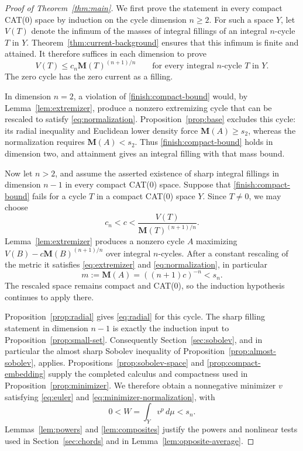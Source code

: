\documentclass[11pt]{article}
\numberwithin{equation}{section}
\theoremstyle{definition}
\theoremstyle{remark}
\begin{document}
\begin{proof}[Proof of Theorem~\ref{thm:main}]
We first prove the statement in every compact CAT(0) space by induction
on the cycle dimension \(n\ge2\). For such a space \(Y\), let
\(V(T)\) denote the infimum of the masses of integral fillings of an
integral \(n\)-cycle \(T\) in \(Y\). Theorem~\ref{thm:current-background}
ensures that this infimum is finite and attained. It therefore suffices
in each dimension to prove
\begin{equation}
 \label{finish:compact-bound}
 V(T)\le c_n\mathbf M(T)^{(n+1)/n}
 \qquad\text{for every integral }n\text{-cycle }T\text{ in }Y.
\end{equation}
The zero cycle has the zero current as a filling.

In dimension \(n=2\), a violation of
\eqref{finish:compact-bound} would, by Lemma~\ref{lem:extremizer},
produce a nonzero extremizing cycle that can be rescaled to satisfy
\eqref{eq:normalization}. Proposition~\ref{prop:base} excludes this
cycle: its radial inequality and Euclidean lower density force
\(\mathbf M(A)\ge s_2\), whereas the normalization requires
\(\mathbf M(A)<s_2\). Thus \eqref{finish:compact-bound} holds in
dimension two, and attainment gives an integral filling with that mass
bound.

Now let \(n>2\), and assume the asserted existence of sharp integral
fillings in dimension \(n-1\) in every compact CAT(0) space. Suppose
that \eqref{finish:compact-bound} fails for a cycle \(T\) in a compact
CAT(0) space \(Y\). Since \(T\ne0\), we may choose
\[
 c_n<c<\frac{V(T)}{\mathbf M(T)^{(n+1)/n}}.
\]
Lemma~\ref{lem:extremizer} produces a nonzero cycle \(A\) maximizing
\(V(B)-c\mathbf M(B)^{(n+1)/n}\) over integral \(n\)-cycles. After a constant
rescaling of the metric it satisfies \eqref{eq:extremizer} and
\eqref{eq:normalization}, in particular
\[
 m:=\mathbf M(A)=((n+1)c)^{-n}<s_n.
\]
The rescaled space remains compact and CAT(0), so the induction
hypothesis continues to apply there.

Proposition~\ref{prop:radial} gives \eqref{eq:radial} for this cycle.
The sharp filling statement in dimension \(n-1\) is exactly the
induction input to Proposition~\ref{prop:small-set}. Consequently
Section~\ref{sec:sobolev}, and in particular the almost sharp Sobolev
inequality of Proposition~\ref{prop:almost-sobolev}, applies.
Propositions~\ref{prop:sobolev-space} and
\ref{prop:compact-embedding} supply the completed calculus and
compactness used in Proposition~\ref{prop:minimizer}. We therefore
obtain a nonnegative minimizer \(v\) satisfying \eqref{eq:euler} and
\eqref{eq:minimizer-normalization}, with
\[
 0<W=\int_Yv^p\,d\mu<s_n.
\]
Lemmas~\ref{lem:powers} and \ref{lem:composites} justify the powers
and nonlinear tests used in Section~\ref{sec:chords} and in
Lemma~\ref{lem:opposite-average}.


\end{proof}
\end{document}
